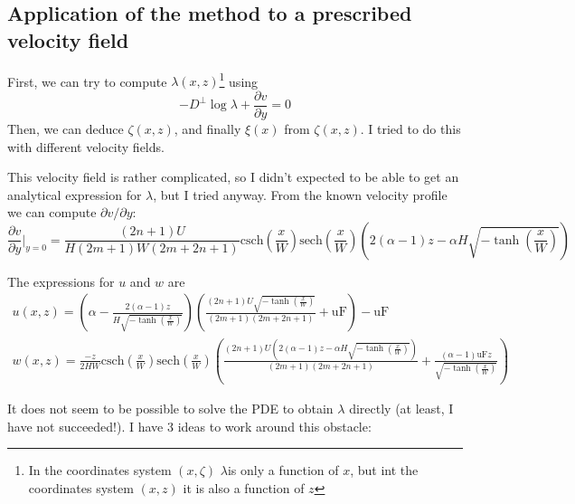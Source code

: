 \documentclass[11pt]{article}
\newcommand{\p}[2]{\ensuremath{\frac{\partial {#1}}{\partial {#2}}}}
\newcommand{\z}{\ensuremath{\zeta}}
\newcommand{\x}{\ensuremath{\xi}}
\newcommand{\lam}{\ensuremath{\lambda}}
\begin{document}
\subsection{Application of the method to a prescribed velocity field}

First, we can try to compute $\lam(x,z)$\footnote{In the coordinates system $(x,\z)$ \lam is only a function of $x$, but int the coordinates system $(x,z)$ it is also a function of $z$} using 
\begin{equation}
	-D^\perp \log \lam + \p{v}{y} = 0
\end{equation}
Then, we can deduce $\z(x,z)$, and finally $\x(x)$ from $\z(x,z)$.
I tried to do this with different velocity fields.

This velocity field is rather complicated, so I didn't expected to be able to get an analytical expression for \lam, but I tried anyway.
From the known velocity profile we can compute $\partial v / \partial y$:
\begin{equation}
	\p{v}{y}\bigg|_{y=0} = 
\frac{(2 n+1) U }{H (2 m+1) W (2 m+2 n+1)}
\text{csch}\left(\frac{x}{W}\right) \text{sech}\left(\frac{x}{W}\right) \left(2 (\alpha -1) z-\alpha  H \sqrt{-\tanh \left(\frac{x}{W}\right)}\right)
\end{equation}

The expressions for $u$ and $w$ are
\begin{align}
	u(x, z) = 
	\left(\alpha -\frac{2 (\alpha -1) z}{H \sqrt{-\tanh \left(\frac{x}{W}\right)}}\right) \left(\frac{(2 n+1) U \sqrt{-\tanh \left(\frac{x}{W}\right)}}{(2 m+1) (2 m+2 n+1)}+\text{uF}\right)-\text{uF} \\
	w(x,z) = \frac{-z}{2 H W}
	\text{csch}\left(\frac{x}{W}\right) \text{sech}\left(\frac{x}{W}\right) \left(\frac{(2 n+1) U \left(2 (\alpha -1) z-\alpha  H \sqrt{-\tanh \left(\frac{x}{W}\right)}\right)}{(2 m+1) (2 m+2 n+1)}+\frac{(\alpha -1) \text{uF} z}{\sqrt{-\tanh \left(\frac{x}{W}\right)}}\right)
\end{align}

It does not seem to be possible to solve the PDE to obtain $\lam$ directly (at least, I have not succeeded!). I have 3 ideas to work around this obstacle:
\end{document}
